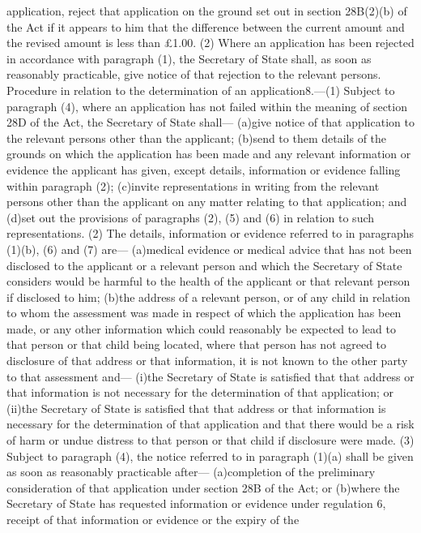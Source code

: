 \documentclass[a4paper]{article}
\begin{document}
application, reject that application on the ground set out in section 28B(2)(b)
of the Act if it appears to him that the difference between the current amount
and the revised amount is less than £1.00.
(2) Where an application has been rejected in accordance with paragraph (1), the
Secretary of State shall, as soon as reasonably practicable, give notice of that
rejection to the relevant persons.
Procedure in relation to the determination of an application8.—(1) Subject to
paragraph (4), where an application has not failed within the meaning of section
28D of the Act, the Secretary of State shall—
(a)give notice of that application to the relevant persons other than the
applicant;
(b)send to them details of the grounds on which the application has been made
and any relevant information or evidence the applicant has given, except
details, information or evidence falling within paragraph (2);
(c)invite representations in writing from the relevant persons other than the
applicant on any matter relating to that application; and
(d)set out the provisions of paragraphs (2), (5) and (6) in relation to such
representations.
(2) The details, information or evidence referred to in paragraphs (1)(b), (6)
and (7) are—
(a)medical evidence or medical advice that has not been disclosed to the
applicant or a relevant person and which the Secretary of State considers would
be harmful to the health of the applicant or that relevant person if disclosed
to him;
(b)the address of a relevant person, or of any child in relation to whom the
assessment was made in respect of which the application has been made, or any
other information which could reasonably be expected to lead to that person or
that child being located, where that person has not agreed to disclosure of that
address or that information, it is not known to the other party to that
assessment and—
(i)the Secretary of State is satisfied that that address or that information is
not necessary for the determination of that application; or
(ii)the Secretary of State is satisfied that that address or that information is
necessary for the determination of that application and that there would be a
risk of harm or undue distress to that person or that child if disclosure were
made.
(3) Subject to paragraph (4), the notice referred to in paragraph (1)(a) shall
be given as soon as reasonably practicable after—
(a)completion of the preliminary consideration of that application under section
28B of the Act; or
(b)where the Secretary of State has requested information or evidence under
regulation 6, receipt of that information or evidence or the expiry of the
\end{document}
